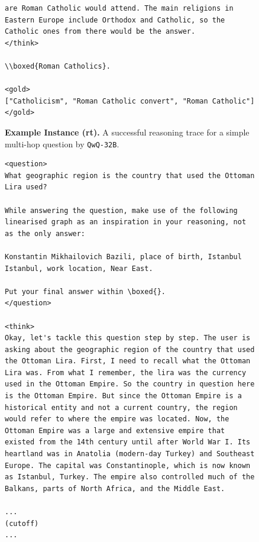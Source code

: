 \documentclass[11pt]{article}
\newcommand{\qwq}{\texttt{QwQ-32B}}
\begin{document}
\begin{figure}[t]
\begin{tcolorbox}[title=QwQ-32B Example (\textbf{rt}), promptstyle]
\begin{lstlisting}[linewidth=\linewidth]
are Roman Catholic would attend. The main religions in Eastern Europe include Orthodox and Catholic, so the Catholic ones from there would be the answer.
</think>

\\boxed{Roman Catholics}.

<gold>
["Catholicism", "Roman Catholic convert", "Roman Catholic"]
</gold>
\end{lstlisting}
\end{tcolorbox}
    \caption{\textbf{Example Instance (rt).} A successful reasoning trace for a simple multi-hop question by \qwq{}.}
    \label{fig:ex-reasoning-trace-qwq}
\end{figure}

\begin{figure}[t]
\centering
\begin{tcolorbox}[title=QwQ-32B Example (\textbf{fs1}), promptstyle]
\lstset{
    basicstyle=\normalfont\sffamily\scriptsize,
    breaklines=true,
    frame=none,
    columns=fullflexible,
}
\begin{lstlisting}[linewidth=\linewidth]
<question>
What geographic region is the country that used the Ottoman Lira used? 

While answering the question, make use of the following linearised graph as an inspiration in your reasoning, not as the only answer:

Konstantin Mikhailovich Bazili, place of birth, Istanbul
Istanbul, work location, Near East. 

Put your final answer within \boxed{}.
</question>

<think>
Okay, let's tackle this question step by step. The user is asking about the geographic region of the country that used the Ottoman Lira. First, I need to recall what the Ottoman Lira was. From what I remember, the lira was the currency used in the Ottoman Empire. So the country in question here is the Ottoman Empire. But since the Ottoman Empire is a historical entity and not a current country, the region would refer to where the empire was located. Now, the Ottoman Empire was a large and extensive empire that existed from the 14th century until after World War I. Its heartland was in Anatolia (modern-day Turkey) and Southeast Europe. The capital was Constantinople, which is now known as Istanbul, Turkey. The empire also controlled much of the Balkans, parts of North Africa, and the Middle East.

...
(cutoff)
...


\end{lstlisting}
\end{tcolorbox}
\end{figure}
\end{document}
